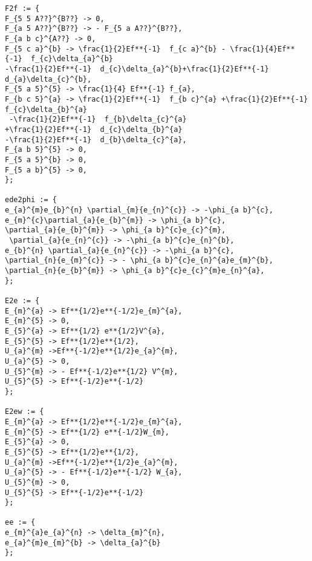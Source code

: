 \documentclass[11pt]{article}
\begin{document}
{\begin{verbatim}
F2f := {
F_{5 5 A??}^{B??} -> 0,
F_{a 5 A??}^{B??} -> - F_{5 a A??}^{B??},
F_{a b c}^{A??} -> 0,
F_{5 c a}^{b} -> \frac{1}{2}Ef**{-1}  f_{c a}^{b} - \frac{1}{4}Ef**{-1}  f_{c}\delta_{a}^{b}
-\frac{1}{2}Ef**{-1}  d_{c}\delta_{a}^{b}+\frac{1}{2}Ef**{-1}  d_{a}\delta_{c}^{b},
F_{5 a 5}^{5} -> \frac{1}{4} Ef**{-1} f_{a},
F_{b c 5}^{a} -> \frac{1}{2}Ef**{-1}  f_{b c}^{a} +\frac{1}{2}Ef**{-1}  f_{c}\delta_{b}^{a}
 -\frac{1}{2}Ef**{-1}  f_{b}\delta_{c}^{a} 
+\frac{1}{2}Ef**{-1}  d_{c}\delta_{b}^{a}
-\frac{1}{2}Ef**{-1}  d_{b}\delta_{c}^{a},
F_{a b 5}^{5} -> 0,
F_{5 a 5}^{b} -> 0,
F_{5 a b}^{5} -> 0,
};

ede2phi := {
e_{a}^{m}e_{b}^{n} \partial_{m}{e_{n}^{c}} -> -\phi_{a b}^{c},
e_{m}^{c}\partial_{a}{e_{b}^{m}} -> \phi_{a b}^{c},
\partial_{a}{e_{b}^{m}} -> \phi_{a b}^{c}e_{c}^{m},
 \partial_{a}{e_{n}^{c}} -> -\phi_{a b}^{c}e_{n}^{b},
e_{b}^{n} \partial_{a}{e_{n}^{c}} -> -\phi_{a b}^{c},
\partial_{n}{e_{m}^{c}} -> - \phi_{a b}^{c}e_{n}^{a}e_{m}^{b},
\partial_{n}{e_{b}^{m}} -> \phi_{a b}^{c}e_{c}^{m}e_{n}^{a},
};

E2e := {
E_{m}^{a} -> Ef**{1/2}e**{-1/2}e_{m}^{a},
E_{m}^{5} -> 0,
E_{5}^{a} -> Ef**{1/2} e**{1/2}V^{a},
E_{5}^{5} -> Ef**{1/2}e**{1/2},
U_{a}^{m} ->Ef**{-1/2}e**{1/2}e_{a}^{m},
U_{a}^{5} -> 0,
U_{5}^{m} -> - Ef**{-1/2}e**{1/2} V^{m},
U_{5}^{5} -> Ef**{-1/2}e**{-1/2}
};

E2ew := {
E_{m}^{a} -> Ef**{1/2}e**{-1/2}e_{m}^{a},
E_{m}^{5} -> Ef**{1/2} e**{-1/2}W_{m},
E_{5}^{a} -> 0,
E_{5}^{5} -> Ef**{1/2}e**{1/2},
U_{a}^{m} ->Ef**{-1/2}e**{1/2}e_{a}^{m},
U_{a}^{5} -> - Ef**{-1/2}e**{-1/2} W_{a},
U_{5}^{m} -> 0,
U_{5}^{5} -> Ef**{-1/2}e**{-1/2}
};

ee := {
e_{m}^{a}e_{a}^{n} -> \delta_{m}^{n},
e_{a}^{m}e_{m}^{b} -> \delta_{a}^{b}
};
\end{verbatim}}
\end{document}
